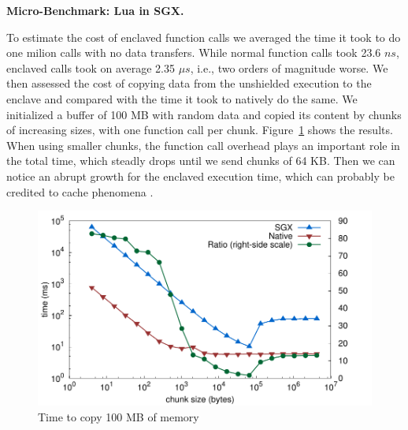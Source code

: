 \textbf{Micro-Benchmark: Lua in SGX.}

To estimate the cost of enclaved function calls we averaged the time it took to do one milion calls with no data transfers. 
While normal function calls took 23.6 $ns$, enclaved calls took on average 2.35 $\mu s$, i.e., two orders of magnitude worse. 
We then assessed the cost of copying data from the unshielded execution to the enclave and compared with the time it took to natively do the same. 
We initialized a buffer of 100 MB with random data and copied its content by chunks of increasing sizes, with one function call per chunk. 
Figure~\ref{fig:sgxmemcpy} shows the results. When using smaller chunks, the function call overhead plays an important role in the total time, which steadly drops until we send chunks of 64 KB. Then we can notice an abrupt growth for the enclaved execution time, which can probably be credited to cache phenomena .

\begin{figure}[t!]
  \centering
  \includegraphics[scale=0.45]{plots/memcpy/memcpy.pdf}
  \caption{Time to copy 100 MB of memory}
  \label{fig:sgxmemcpy}
\end{figure}

